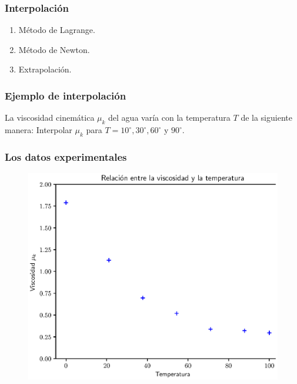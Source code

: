 \documentclass[12pt]{beamer}
\begin{document}
\begin{frame}
\frametitle{Interpolación}
\begin{enumerate}[<+->]
\item Método de Lagrange.
\item Método de Newton.
\item Extrapolación.
\end{enumerate}
\end{frame}
\begin{frame}
\frametitle{Ejemplo de interpolación}
La viscosidad cinemática $\mu_{k}$ del agua varía con la temperatura $T$ de la siguiente manera:
Interpolar $\mu_{k}$ para $T= 10^{\circ},30^{\circ},60^{\circ}$ y $90^{\circ}$.
\end{frame}
\begin{frame}
\frametitle{Los datos experimentales}
\begin{figure}
    \centering
    \includegraphics[scale=0.575]{Imagenes/Intro_Interpolacion_01.eps}
\end{figure}
\end{frame}
\end{document}
